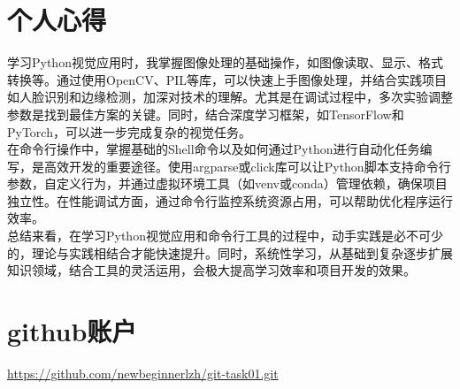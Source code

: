 \documentclass[a4paper, 12pt]{article}
\begin{document}
\section{个人心得}

学习Python视觉应用时，我掌握图像处理的基础操作，如图像读取、显示、格式转换等。通过使用OpenCV、PIL等库，可以快速上手图像处理，并结合实践项目如人脸识别和边缘检测，加深对技术的理解。尤其是在调试过程中，多次实验调整参数是找到最佳方案的关键。同时，结合深度学习框架，如TensorFlow和PyTorch，可以进一步完成复杂的视觉任务。
\\
\indent 在命令行操作中，掌握基础的Shell命令以及如何通过Python进行自动化任务编写，是高效开发的重要途径。使用argparse或click库可以让Python脚本支持命令行参数，自定义行为，并通过虚拟环境工具（如venv或conda）管理依赖，确保项目独立性。在性能调试方面，通过命令行监控系统资源占用，可以帮助优化程序运行效率。
\\
\indent 总结来看，在学习Python视觉应用和命令行工具的过程中，动手实践是必不可少的，理论与实践相结合才能快速提升。同时，系统性学习，从基础到复杂逐步扩展知识领域，结合工具的灵活运用，会极大提高学习效率和项目开发的效果。

\section{github账户}
\href{https://github.com/newbeginnerlzh/git-task01.git}{\color{red}https://github.com/newbeginnerlzh/git-task01.git}
\end{document}
